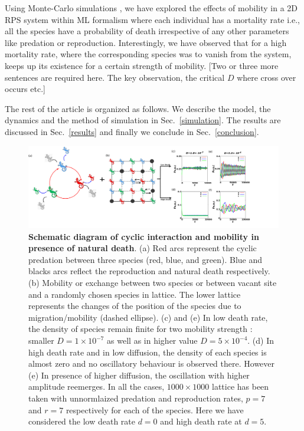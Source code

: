 \documentclass[aps, pre, twocolumn, amsmath, superscriptaddress,showkeys,showpacs]{revtex4-1}
\begin{document}
	Using Monte-Carlo simulations \cite{mooney1997monte, zio2013monte}, we have explored the effects of mobility in a 2D RPS system within ML formalism where {\color{red}each individual has a mortality rate i.e., all the species have a probability of death} irrespective of any other parameters like predation or reproduction. Interestingly, we have observed that for a {\color{red}high mortality rate, where the corresponding species was to vanish from the system, keeps up its existence for a certain strength of mobility}. {\color{blue} [Two or three more sentences are required here. The key observation, the critical $D$ where cross over occurs etc.]}
	\par {\color{red}The rest of the article is organized as follows. We describe the model, the dynamics and the method of simulation in Sec.~\ref{simulation}. The results are discussed in Sec.~\ref{results} and finally we conclude in Sec.~\ref{conclusion}.}
	\begin{figure}[ht!]
	\centering
	\includegraphics[width=1.0\textwidth]{Diagram1.png}
	\caption{{\bf Schematic diagram of cyclic interaction and mobility in presence of natural death}. (a) Red arcs represent the cyclic predation between three species (red, blue, and green). Blue and blacks  arcs reflect the reproduction  and natural death respectively. (b) Mobility or exchange between two species or between vacant site and a randomly chosen species in lattice. The  lower lattice represents the changes of the position of the species due to migration/mobility (dashed ellipse). (c) and (e) In low death rate, the density of species remain finite for two mobility strength : smaller  $D=1\times 10^{-7}$  as well as in higher value $D=5\times 10^{-4}$. (d) In high death rate and in low diffusion, the density of each species is almost zero and no oscillatory behaviour is observed there. However  (e) In presence of higher diffusion, the oscillation with higher amplitude reemerges. In all the cases, $1000\times 1000$ lattice has been taken with unnormlaized predation and reproduction rates, $p=7$ and $r=7$ respectively for each of the species. {\color{blue}Here we have considered the low death rate $d=0$ and high death rate at $d=5$.}  }
	\label{fig1}
\end{figure}	
	
\end{document}
